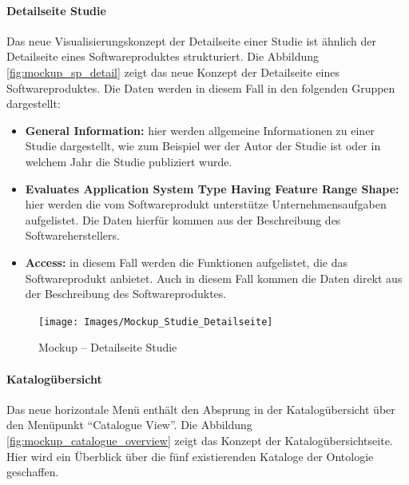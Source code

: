 \paragraph{Detailseite Studie}

Das neue Visualisierungskonzept der Detailseite einer Studie ist ähnlich der Detailseite eines Softwareproduktes strukturiert.
Die Abbildung \ref{fig:mockup_sp_detail} zeigt das neue Konzept der Detailseite eines Softwareproduktes.
Die Daten werden in diesem Fall in den folgenden Gruppen dargestellt:

\begin{itemize}
\item \textbf{General Information:} hier werden allgemeine Informationen zu einer Studie dargestellt, wie zum Beispiel wer der Autor der Studie ist oder in welchem Jahr die Studie publiziert wurde.
\item \textbf{Evaluates Application System Type Having Feature Range Shape:} hier werden die vom Softwareprodukt unterstütze Unternehmensaufgaben aufgelistet. Die Daten hierfür kommen aus der Beschreibung des Softwareherstellers.
\item \textbf{Access:} in diesem Fall werden die Funktionen aufgelistet, die das Softwareprodukt anbietet. Auch in diesem Fall kommen die Daten direkt aus der Beschreibung des Softwareproduktes.
\end{itemize}

\begin{figure}[H]
	\centering
    	\texttt{[image: Images/Mockup\_Studie\_Detailseite]}
   	\caption[Mockup -- Detailseite Studie]{Mockup -- Detailseite Studie}
   	\label{fig:mockup_study_detail}
\end{figure}

\clearpage

\paragraph{Katalogübersicht}

Das neue horizontale Menü enthält den Absprung in der Katalogübersicht über den Menüpunkt \enquote{Catalogue View}.
Die Abbildung \ref{fig:mockup_catalogue_overview} zeigt das Konzept der Katalogübersichtseite.
Hier wird ein Überblick über die fünf existierenden Kataloge der Ontologie geschaffen.

